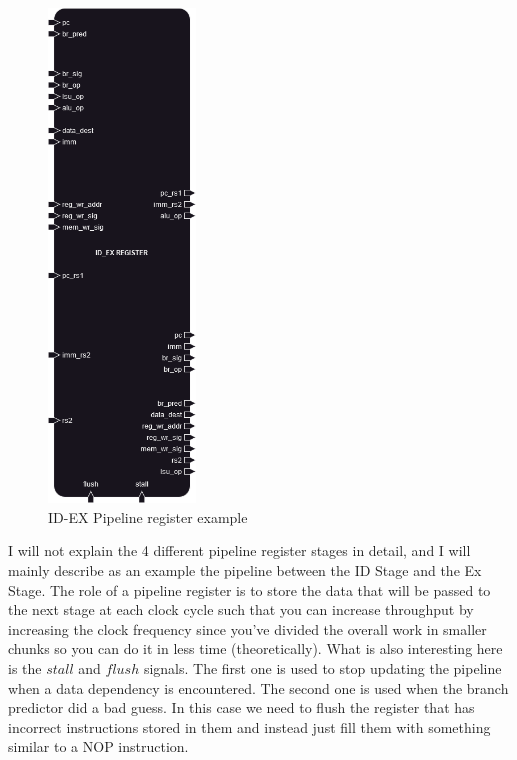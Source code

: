 \begin{figure}[H]
    \centering
    \includegraphics[width=0.35\textwidth]{../diagrams/pipeline/pipeline.png}
    \caption{ID-EX Pipeline register example}
    \label{fig:pipeline}
\end{figure}

I will not explain the 4 different pipeline register stages in detail, and I will mainly describe as an example the 
pipeline between the ID Stage and the Ex Stage. The role of a pipeline register is to store the data that will be
passed to the next stage at each clock cycle such that you can increase throughput by increasing the clock frequency since 
you've divided the overall work in smaller chunks so you can do it in less time (theoretically).
What is also interesting here is the $stall$ and $flush$ signals. The first one is used to stop updating the pipeline when 
a data dependency is encountered. The second one is used when the branch predictor did a bad guess. In this case we need to 
flush the register that has incorrect instructions stored in them and instead just fill them with something similar to a NOP 
instruction.